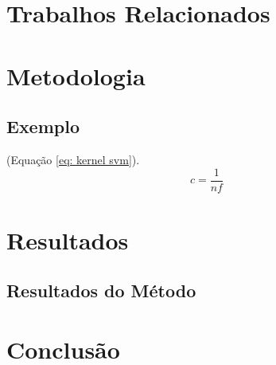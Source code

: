 \documentclass[
	12pt,				%
	openright,			%
	oneside,			%
	a4paper,			%
	english,			%
	french,				%
	spanish,			%
	brazil,				%
	]{abntex2}
\begin{document}
\chapter{Trabalhos Relacionados}
\label{ch: trabalhos relacionados}

\chapter{Metodologia}
\label{ch: materiais e métodos}

\section{Exemplo}

 (Equação \ref{eq: kernel svm}).
\begin{equation}
\label{eq: kernel svm}
    c = \frac {1} {\textit{nf}}
\end{equation}




\chapter{Resultados}
\label{ch: resultados} 


\section{Resultados do Método}
\label{sec: resultados}



 \chapter{Conclusão}
 \label{ch: conclusao}
 



% 
\end{document}

